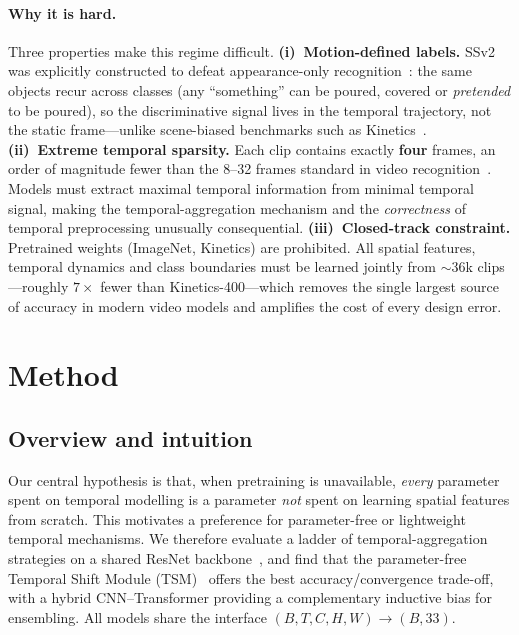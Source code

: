 \documentclass[10pt,twocolumn,letterpaper]{article}
\begin{document}
\paragraph{Why it is hard.}
Three properties make this regime difficult.
\textbf{(i)~Motion-defined labels.} SSv2 was explicitly constructed to defeat
appearance-only recognition~\cite{goyal2017ssv2}: the same objects recur across
classes (any ``something'' can be poured, covered or \emph{pretended} to be
poured), so the discriminative signal lives in the temporal trajectory, not the
static frame---unlike scene-biased benchmarks such as Kinetics~\cite{kay2017kinetics}.
\textbf{(ii)~Extreme temporal sparsity.} Each clip contains exactly
\textbf{four} frames, an order of magnitude fewer than the 8--32 frames standard
in video recognition~\cite{lin2019tsm,bertasius2021timesformer}. Models must
extract maximal temporal information from minimal temporal signal, making the
temporal-aggregation mechanism and the \emph{correctness} of temporal
preprocessing unusually consequential.
\textbf{(iii)~Closed-track constraint.} Pretrained weights (ImageNet, Kinetics)
are prohibited. All spatial features, temporal dynamics and class boundaries
must be learned jointly from ${\sim}36$k clips---roughly $7\times$ fewer than
Kinetics-400---which removes the single largest source of accuracy in modern
video models and amplifies the cost of every design error.

\section{Method}
\label{sec:method}

\subsection{Overview and intuition}
Our central hypothesis is that, when pretraining is unavailable, \emph{every}
parameter spent on temporal modelling is a parameter \emph{not} spent on
learning spatial features from scratch. This motivates a preference for
parameter-free or lightweight temporal mechanisms. We therefore evaluate a
ladder of temporal-aggregation strategies on a shared ResNet
backbone~\cite{he2016resnet}, and find that the parameter-free Temporal Shift
Module (TSM)~\cite{lin2019tsm} offers the best accuracy/convergence trade-off,
with a hybrid CNN--Transformer providing a complementary inductive bias for
ensembling. All models share the interface
$(B,T,C,H,W)\!\rightarrow\!(B,\text{33})$.
\end{document}
